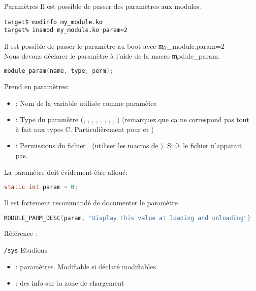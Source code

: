 \begin{frame}[fragile=singleslide]{Paramètres}
  Il est possible de passer des paramètres aux modules:
  \begin{lstlisting}
target$ modinfo my_module.ko 
target% insmod my_module.ko param=2  
  \end{lstlisting} %
  Il est possible de passer le paramètre au boot avec \c{my_module.param=2}
\\[2ex]
  Nous   devons  déclarer   le  paramètre   à  l'aide   de   la  macro
  \c{module_param}.
  \begin{lstlisting}[language=c]
module_param(name, type, perm);
  \end{lstlisting} 
  Prend en paramètres:
  \begin{itemize} 
  \item {}: Nom de la variable utilisée comme paramètre
  \item  {}:  Type   du  paramètre  (,  ,
    ,  ,   ,  ,  ,
    , ) (remarquez que  ca ne correspond pas tout
    à  fait   aux  types   C.  Particulièrement  pour     et
    )
  \item        {}:        Permissions        du        fichier
    .    (utiliser   les
    macros de ). Si 0, le fichier n'apparait pas.
  \end{itemize}
  La paramètre doit évidement être alloué:
  \begin{lstlisting}[language=c]
static int param = 0;
  \end{lstlisting} 
  Il est fortement recommandé de documenter le paramètre
  \begin{lstlisting}[language=c]
MODULE_PARM_DESC(param, "Display this value at loading and unloading");
  \end{lstlisting} 
Référence : 

\end{frame}

\begin{frame}[fragile=singleslide]{\texttt{/sys}}
  Etudions 
  \begin{itemize}
  \item                       {}:
    paramètres. Modifiable si déclaré modifiables
  \item {}:  des info sur  la zone
    de chargement
  \end{itemize}
\end{frame}

